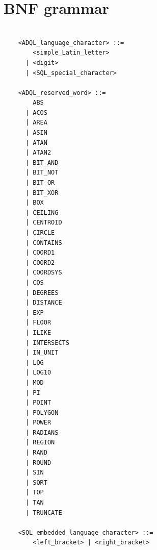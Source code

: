 \documentclass[11pt,a4paper]{ivoa}
\begin{document}
\newpage
\appendix
\section{BNF grammar}
\label{sec:grammar}

\begin{verbatim}

    <ADQL_language_character> ::=
        <simple_Latin_letter>
      | <digit>
      | <SQL_special_character>

    <ADQL_reserved_word> ::=
        ABS
      | ACOS
      | AREA
      | ASIN
      | ATAN
      | ATAN2
      | BIT_AND
      | BIT_NOT
      | BIT_OR
      | BIT_XOR
      | BOX
      | CEILING
      | CENTROID
      | CIRCLE
      | CONTAINS
      | COORD1
      | COORD2
      | COORDSYS
      | COS
      | DEGREES
      | DISTANCE
      | EXP
      | FLOOR
      | ILIKE
      | INTERSECTS
      | IN_UNIT
      | LOG
      | LOG10
      | MOD
      | PI
      | POINT
      | POLYGON
      | POWER
      | RADIANS
      | REGION
      | RAND
      | ROUND
      | SIN
      | SQRT
      | TOP
      | TAN
      | TRUNCATE

    <SQL_embedded_language_character> ::=
        <left_bracket> | <right_bracket>


\end{verbatim}
\end{document}
